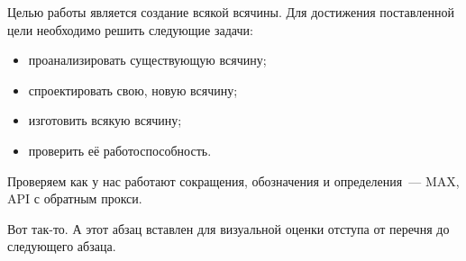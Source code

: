 \Introduction

Целью работы является создание всякой всячины. Для достижения поставленной цели необходимо решить следующие задачи:

\begin{itemize}
\item проанализировать существующую всячину;
\item спроектировать свою, новую всячину;
\item изготовить всякую всячину;
\item проверить её работоспособность.
\end{itemize}

Проверяем как у нас работают сокращения, обозначения и определения~--- 
MAX, 
API 
с обратным прокси.


Вот так-то. А этот абзац вставлен для визуальной оценки отступа от перечня до следующего абзаца.

